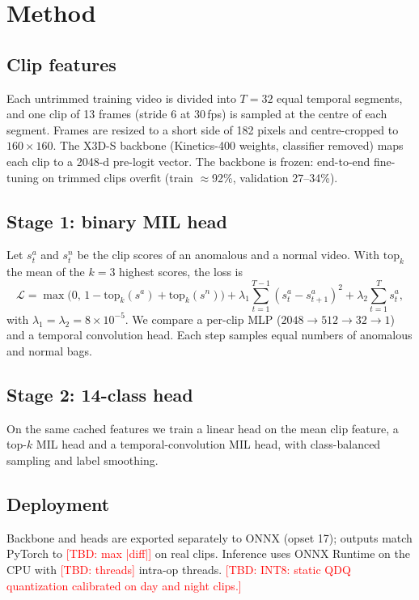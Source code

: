\documentclass[journal]{IEEEtran}
\newcommand{\TBD}[1]{\textcolor{red}{[TBD: #1]}}
\begin{document}
\section{Method}\label{sec:method}
\subsection{Clip features}
Each untrimmed training video is divided into $T{=}32$ equal temporal segments, and one clip of
13 frames (stride 6 at 30\,fps) is sampled at the centre of each segment. Frames are resized to
a short side of 182 pixels and centre-cropped to $160\times160$. The X3D-S backbone (Kinetics-400
weights, classifier removed) maps each clip to a 2048-d pre-logit vector. The backbone is frozen:
end-to-end fine-tuning on trimmed clips overfit (train $\approx$92\%, validation 27--34\%).

\subsection{Stage 1: binary MIL head}
Let $s^a_t$ and $s^n_t$ be the clip scores of an anomalous and a normal video. With $\mathrm{top}_k$
the mean of the $k{=}3$ highest scores, the loss is
\begin{equation}
\mathcal{L} = \max\!\big(0,\,1-\mathrm{top}_k(s^a)+\mathrm{top}_k(s^n)\big)
+ \lambda_1 \sum_{t=1}^{T-1}(s^a_t-s^a_{t+1})^2 + \lambda_2 \sum_{t=1}^{T} s^a_t,
\end{equation}
with $\lambda_1=\lambda_2=8\times10^{-5}$. We compare a per-clip MLP ($2048{\to}512{\to}32{\to}1$)
and a temporal convolution head. Each step samples equal numbers of anomalous and normal bags.

\subsection{Stage 2: 14-class head}
On the same cached features we train a linear head on the mean clip feature, a top-$k$ MIL head
and a temporal-convolution MIL head, with class-balanced sampling and label smoothing.

\subsection{Deployment}
Backbone and heads are exported separately to ONNX (opset 17); outputs match PyTorch to
\TBD{max |diff|} on real clips. Inference uses ONNX Runtime on the CPU with
\TBD{threads} intra-op threads. \TBD{INT8: static QDQ quantization calibrated on day and night clips.}
\end{document}
